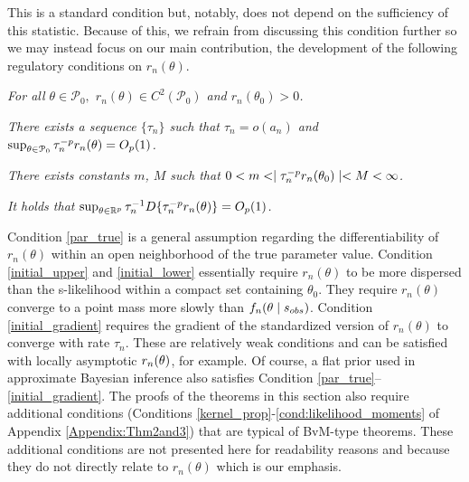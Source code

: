 This is a standard condition but, notably, does not depend on the sufficiency of this statistic. Because of this, we refrain from discussing this condition further so we may instead focus on our main contribution, the development of the following regulatory conditions on $r_{n}(\theta)$.  
	
\begin{condition} \label{par_true}
{\it %
For all $\theta \in \mathcal{P}_{0},$ $r_{n}(\theta) \in C^2(\mathcal{P}_{0})$ and $r_{n}(\theta_0)>0$.}
\end{condition}
	
\begin{condition} \label{initial_upper}
{\it There exists a sequence $\{\tau_{n}\}$ %
such that $\tau_{n}=o(a_n)$ and $\sup_{\btheta\in {\cal P}_{0}}\tau_{n}^{-p}r_{n}(\btheta)=O_{p}(1)$.}
\end{condition}
	
\begin{condition} \label{initial_lower}
{\it There exists constants $m$, $M$ such that $0 < m <\mid \tau_{n}^{-p}r_{n}(\btheta_{0})\mid < M < \infty$.}
\end{condition}
	
\begin{condition} \label{initial_gradient}
{\it It holds that $\sup_{\btheta\in\mathbb{R}^{p}}\tau_{n}^{-1} D\{\tau_{n}^{-p}r_{n}(\btheta)\}=O_{p}(1)$.}
\end{condition}
	
Condition \ref{par_true} is a general assumption regarding the differentiability of $r_{n}(\theta)$ within an open neighborhood of the true parameter value. Condition \ref{initial_upper} and \ref{initial_lower} essentially require $r_{n}(\theta)$ to be more dispersed than the s-likelihood within a compact set containing $\theta_0$. They require $r_{n}(\theta)$ converge to a point mass more slowly than $f_{n}(\theta \mid s_{\rm obs})$. Condition \ref{initial_gradient} requires the gradient of the standardized version of $r_{n}(\theta)$ to converge with rate $\tau_n$. These are relatively weak conditions and can be satisfied with locally asymptotic $r_{n}(\btheta)$, for example. Of course, a flat prior used in approximate Bayesian inference
also satisfies Condition \ref{par_true}--\ref{initial_gradient}. The proofs of %
the theorems in this section also require additional conditions (Conditions \ref{kernel_prop}-\ref{cond:likelihood_moments} of Appendix \ref{Appendix:Thm2and3}) that are typical of BvM-type theorems. These additional conditions are not presented here for readability reasons and because they do not directly relate to $r_n(\theta)$ which is our emphasis.  


